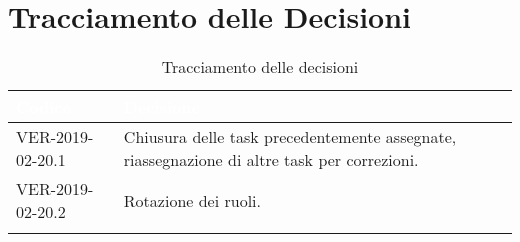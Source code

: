 \section{Tracciamento delle Decisioni}

\begin{longtable}{|C{.40\textwidth}|C{.60\textwidth}|}
\hline
{}\textbf{\textcolor{white}{Codice}} & \textbf{\textcolor{white}{Decisione}}\\
\hline
VER-2019-02-20.1 & Chiusura delle task precedentemente assegnate, riassegnazione di altre task per correzioni.\\
\hline
{}VER-2019-02-20.2 & Rotazione dei ruoli.\\
\hline
\caption{Tracciamento delle decisioni}
\end{longtable}
